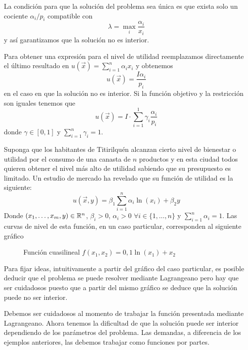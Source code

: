 \begin{ejemplo}
La condici\'on para que la soluci\'on del problema sea \'unica es que exista solo un cociente $\alpha_i / p_i$ compatible con
$$\lambda = \max_i \frac{\alpha_i}{x_i}$$
y as\'i garantizamos que la soluci\'on no es interior.

Para obtener una expresi\'on para el nivel de utilidad reemplazamos directamente el \'ultimo resultado en $u(\vec{x}) = \sum_{i=1}^n \alpha_i x_i$ y obtenemos
$$u(\vec{x}) = \frac{I\alpha_i}{p_i}$$
en el caso en que la soluci\'on no es interior. Si la funci\'on objetivo y la restricci\'on son iguales tenemos que
$$u(\vec{x}) = I \cdot \sum_{i=1}^1 \gamma_i \frac{\alpha_i}{p_i}$$
donde $\gamma \in [0,1]$ y $\sum_{i=1}^n \gamma_i = 1$.
\end{ejemplo}

\begin{ejemplo}\label{ejemplo-micro-6}
Suponga que los habitantes de Titirilqu\'en alcanzan cierto nivel de bienestar o utilidad por el consumo de una canasta de $n$ productos y en esta ciudad todos quieren obtener el nivel m\'as alto de utilidad sabiendo que su presupuesto es limitado. Un estudio de mercado ha revelado que su funci\'on de utilidad es la siguiente:
$$u(\vec{x},y) = \beta_1 \sum_{i=1}^n  \alpha_i \ln (x_i) + \beta_2 y$$
Donde $(x_1,\ldots,x_{m},y)\in \mathbb{R}^n$, $\beta_i > 0$, $\alpha_i > 0$ $\forall i\in\{1,\ldots , n\}$ y $\sum_{i=1}^n \alpha_i = 1$. Las curvas de nivel de esta funci\'on, en un caso particular, corresponden al siguiente gr\'afico

\begin{figure}[H]
	\centering
	
	\caption{Funci\'on cuasilineal $f(x_1,x_2)=0,1\ln(x_1)+x_2$}
\end{figure}

Para fijar ideas, intuitivamente a partir del gr\'afico del caso particular, es posible deducir que el problema se puede resolver mediante Lagrangeano pero hay que ser cuidadosos puesto que a partir del mismo gr\'afico se deduce que la soluci\'on puede no ser interior.

Debemos ser cuidadosos al momento de trabajar la funci\'on presentada mediante Lagrangeano. Ahora tenemos la dificultad de que la soluci\'on puede ser interior dependiendo de los par\'ametros del problema. Las demandas, a diferencia de los ejemplos anteriores, las debemos trabajar como funciones por partes.


\end{ejemplo}
